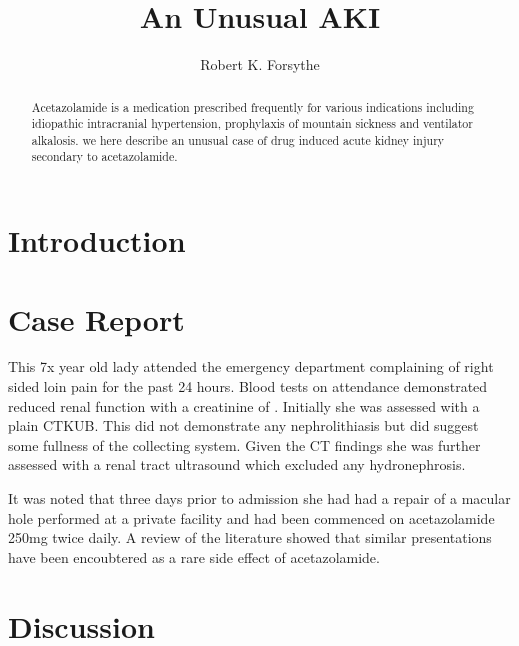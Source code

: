 \documentclass[11pt]{article}
\title{An Unusual AKI}
\author{Robert K. Forsythe}
\begin{document}
\maketitle
\begin{abstract}
	Acetazolamide is a medication prescribed frequently for various indications including idiopathic intracranial hypertension, prophylaxis of mountain sickness and ventilator alkalosis. we here describe an unusual case of drug induced acute kidney injury secondary to acetazolamide. 
\end{abstract}

\section*{Introduction}


		
\section*{Case Report}

This 7x year old lady attended the emergency department complaining of right sided loin pain for the past 24 hours. Blood tests on attendance demonstrated reduced renal function with a creatinine of \todo. Initially she was assessed with a plain CTKUB. This did not demonstrate any nephrolithiasis but did suggest some fullness of the collecting system. Given the CT findings she was further assessed with a renal tract ultrasound which excluded any hydronephrosis. 

It was noted that three days prior to admission she had had a repair of a macular hole performed at a private facility and had been commenced on acetazolamide 250mg twice daily. A review of the literature showed that similar presentations have been encoubtered as a rare side effect of acetazolamide. 





\section*{Discussion}
\end{document}

